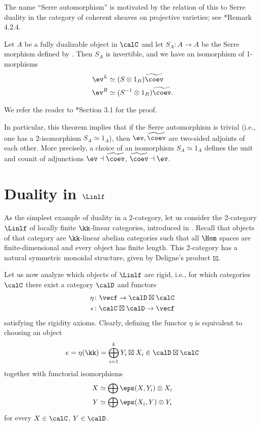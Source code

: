 \begin{remark}
  The name ``Serre automorphism'' is motivated by the relation of this to Serre
  duality in the category of coherent sheaves on projective varieties; see
  *{Remark 4.2.4}.
\end{remark}


\begin{theorem}\label{t:serre}
  Let $A$ be a fully dualizable object in $\calC$ and let
  $S_A\colon A\to A$ be the Serre morphism defined by .
   Then $S_A$ is invertible, and we have an isomorphism of 1-morphisms
   \begin{align*}
   \ev^L&\simeq (S\otimes 1_B)  \widetilde \coev \\
   \ev^R&\simeq (S^{-1}\otimes 1_B)\widetilde \coev.
   \end{align*}
\end{theorem}
We refer the reader to *{Section 3.1} for the proof.

In particular, this theorem implies that if the Serre automorphism is trivial
(i.e., one has a 2-isomorphism $S_A\simeq 1_A$), then $\ev, \widetilde\coev$ are
two-sided adjoints of each other. More precisely, a choice of an isomorphism
$S_A\simeq 1_A$ defines the unit and counit of adjunctions $\ev\dashv
\widetilde\coev$, $\widetilde\coev\dashv\ev$.



\section{Duality in $\Linlf$}\label{s:lin-duals}
As the simplest example of duality in a 2-category, let us consider the
2-category $\Linlf$ of locally finite $\kk$-linear  categories, introduced in
. Recall that objects of that category are $\kk$-linear
abelian categories such that all $\Hom$ spaces are finite-dimensional and every
object has finite length. This 2-category has a natural symmetric monoidal
structure, given by Deligne's product $\boxtimes$.

Let us now analyze which objects of $\Linlf$ are rigid, i.e., for which
categories $\calC$ there exist a category $\calD$ and functors
\begin{align*}
  \eta&\colon \vecf \to \calD\boxtimes \calC\\
  \epsilon&\colon \calC\boxtimes \calD\to \vecf
\end{align*}
satisfying the rigidity axioms. Clearly, defining the functor $\eta$ is equivalent
to choosing an object
$$
  e=\eta (\kk)=\bigoplus_{i=1}^k Y_i\boxtimes X_i\in \calD\boxtimes \calC
$$
together with functorial isomorphisms
\begin{equation}\label{e:rigidity-lin}
  \begin{aligned}
    X&\simeq \bigoplus \eps(X,Y_i)\otimes X_i\\
    Y&\simeq \bigoplus \eps(X_i,Y)\otimes Y_i
  \end{aligned}
\end{equation}
for every $X\in \calC$, $Y\in \calD$.

